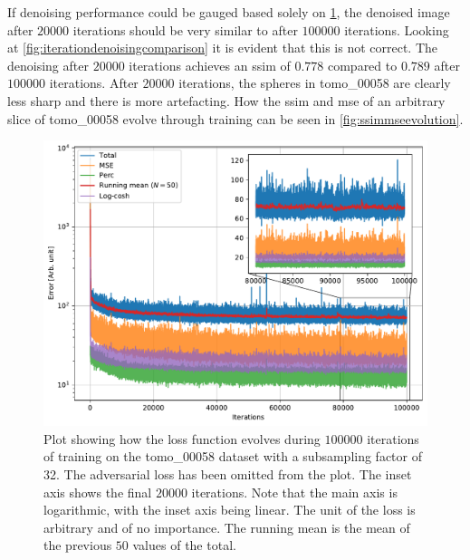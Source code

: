 If denoising performance could be gauged based solely on \cref{fig:losstomo00058noadv}, the denoised image after $20000$ iterations should be very similar to after $100000$ iterations. Looking at \cref{fig:iterationdenoisingcomparison} it is evident that this is not correct. The denoising after $20000$ iterations achieves an \acrshort{ssim} of $0.778$ compared to $0.789$ after $100000$ iterations. After $20000$ iterations, the spheres in tomo\_00058 are clearly less sharp and there is more artefacting. How the \acrshort{ssim} and \acrshort{mse} of an arbitrary slice of tomo\_00058 evolve through training can be seen in \cref{fig:ssimmseevolution}.

\begin{figure}[htbp]
  \centering
  \includegraphics[width=.85\textwidth]{figures/losstomo00058ns32itd4mse035logcosh3depth1.pdf}
  \caption[Loss function evolution during training]{Plot showing how the loss function evolves during $100000$ iterations of training on the tomo\_00058 dataset with a subsampling factor of 32. The adversarial loss has been omitted from the plot. The inset axis shows the final $20000$ iterations. Note that the main axis is logarithmic, with the inset axis being linear. The unit of the loss is arbitrary and of no importance. The running mean is the mean of the previous $50$ values of the total. }
  \label{fig:losstomo00058noadv}
\end{figure}

